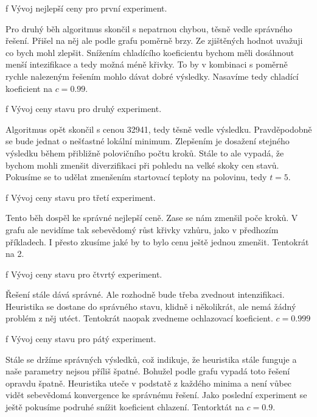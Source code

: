 \centerline{ \picwidth=14cm  }
\caption/f Vývoj nejlepší ceny pro první experiment.
\bigskip

Pro druhý běh algoritmus skončil s nepatrnou chybou, těsně vedle správného řešení. Přišel na něj ale podle grafu poměrně brzy. Ze zjištěných hodnot uvažuji co bych mohl zlepšit. Snížením chladícího koeficientu bychom měli dosáhnout menší intezifikace a tedy možná méně  křivky. To by v kombinaci s poměrně rychle nalezeným řešením mohlo dávat dobré výsledky. Nasavíme tedy chladící koeficient na $c=0.99$.

\centerline{ \picwidth=15cm  }
\caption/f Vývoj ceny stavu pro druhý experiment.
\bigskip

Algoritmus opět skončil s cenou 32941, tedy těsně vedle výsledku. Pravděpodobně se bude jednat o nešťastné lokální minimum. Zlepšením je dosažení stejného výsledku během přibližně polovičního počtu kroků. Stále to ale vypadá, že bychom mohli zmenšit diverzifikaci při pohledu na velké skoky cen stavů. Pokusíme se to udělat zmenšením startovací teploty na polovinu, tedy $t=5$.

\centerline{ \picwidth=14cm  }
\caption/f Vývoj ceny stavu pro třetí experiment.
\bigskip

Tento běh dospěl ke správné nejlepší ceně. Zase se nám zmenšil poče kroků. V grafu ale nevidíme tak sebevědomý růst křivky vzhůru, jako v předhozím příkladech. I přesto zkusíme jaké by to bylo cenu ještě jednou zmenšit. Tentokrát na 2. 
\vfill\break

\centerline{ \picwidth=15cm  }
\caption/f Vývoj ceny stavu pro čtvrtý experiment.
\bigskip

Řešení stále dává správné. Ale rozhodně bude třeba zvednout intenzifikaci. Heuristika se dostane do správného stavu, klidně i několikrát, ale nemá žádný problém z něj utéct. Tentokrát naopak zvedneme ochlazovací koeficient. $c=0.999$

\centerline{ \picwidth=15cm  }
\caption/f Vývoj ceny stavu pro pátý experiment.
\bigskip

Stále se držíme správných výsledků, což indikuje, že heuristika stále funguje a naše parametry nejsou příliš špatné. Bohužel podle grafu vypadá toto řešení opravdu špatně. Heuristika uteče v podstatě z každého minima a není vůbec vidět sebevědomá konvergence ke správnému řešení. Jako poslední experiment se ještě pokusíme podruhé snížit koeficient chlazení. Tentorktát na $c=0.9$.

